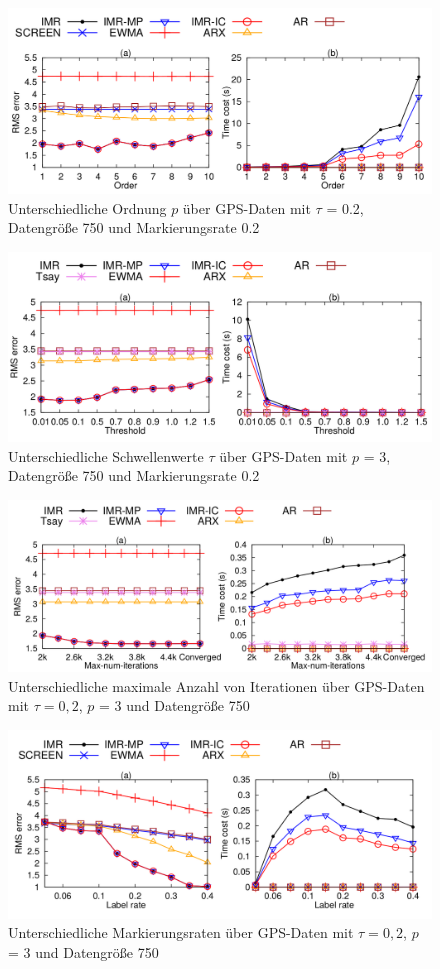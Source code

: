 \begin{figure}[htbp]
    \centering
    \includegraphics[width=\textwidth]{../plots/varying_order_p.png}
    \caption{Unterschiedliche Ordnung $p$ über GPS-Daten mit $\tau$ = 0.2, Datengröße 750 und Markierungsrate 0.2}%
    \label{varying_order_p}
\end{figure}
\begin{figure}[htbp]
    \centering
    \includegraphics[width=\textwidth]{../plots/varying_threshold.png}
    \caption{Unterschiedliche Schwellenwerte $\tau$ über GPS-Daten mit $p$ = 3, Datengröße 750 und Markierungsrate 0.2}%
    \label{varying_threshold}
\end{figure}
\begin{figure}[htbp]
    \centering
    \includegraphics[width=\textwidth]{../plots/varying_maximum_number.png}
    \caption{Unterschiedliche maximale Anzahl von Iterationen über GPS-Daten mit $\tau = 0,2$, $p$ = 3 und Datengröße 750}
    \label{varying_maximum_number}
\end{figure}
\begin{figure}[htbp]
    \centering
    \includegraphics[width=\textwidth]{../plots/varying_labeling_rate.png}
    \caption{Unterschiedliche Markierungsraten über GPS-Daten mit $\tau = 0,2$, $p$ = 3 und Datengröße 750}
    \label{varying_labeling_rate}
\end{figure}
